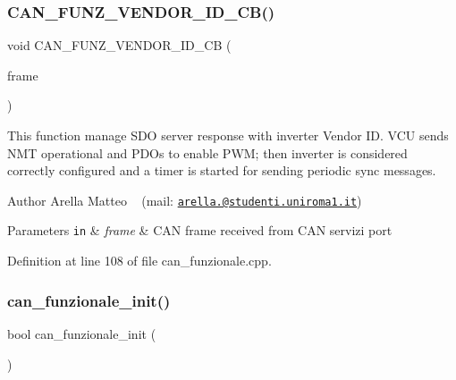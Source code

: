 \subsubsection{\texorpdfstring{C\+A\+N\+\_\+\+F\+U\+N\+Z\+\_\+\+V\+E\+N\+D\+O\+R\+\_\+\+I\+D\+\_\+\+C\+B()}{CAN\_FUNZ\_VENDOR\_ID\_CB()}}
{\footnotesize\ttfamily void C\+A\+N\+\_\+\+F\+U\+N\+Z\+\_\+\+V\+E\+N\+D\+O\+R\+\_\+\+I\+D\+\_\+\+CB (\begin{DoxyParamCaption}\item[{C\+A\+N\+\_\+\+F\+R\+A\+ME $\ast$}]{frame }\end{DoxyParamCaption})}



This function manage S\+DO server response with inverter Vendor ID. V\+CU sends N\+MT operational and P\+D\+Os to enable P\+WM; then inverter is considered correctly configured and a timer is started for sending periodic sync messages. 

\begin{DoxyAuthor}{Author}
Arella Matteo ~\newline
 (mail\+: \href{mailto:arella.1646983@studenti.uniroma1.it}{\tt arella.@studenti.\+uniroma1.\+it})
\end{DoxyAuthor}

\begin{DoxyParams}[1]{Parameters}
\mbox{\tt in}  & {\em frame} & C\+AN frame received from C\+AN servizi port \\
\hline
\end{DoxyParams}


Definition at line 108 of file can\+\_\+funzionale.\+cpp.

\mbox{\label{group___c_a_n__funzionale__group_ga578b28192b0c78942fcc0452d070accb}} 
\subsubsection{\texorpdfstring{can\+\_\+funzionale\+\_\+init()}{can\_funzionale\_init()}}
{\footnotesize\ttfamily bool can\+\_\+funzionale\+\_\+init (\begin{DoxyParamCaption}{ }\end{DoxyParamCaption})}



